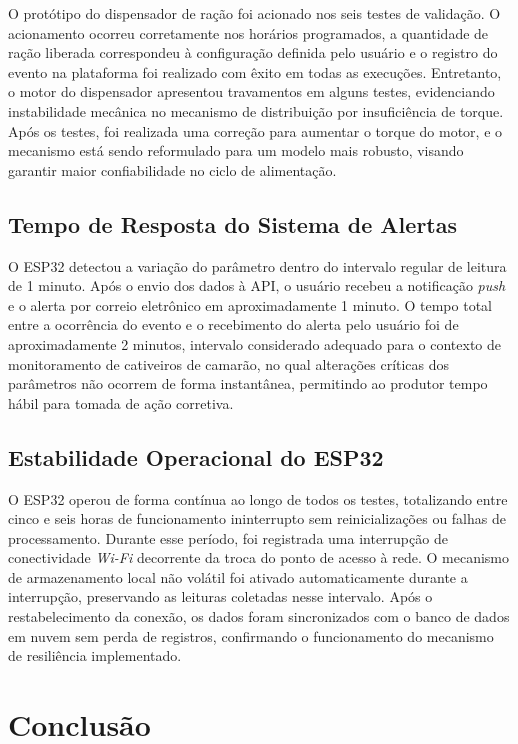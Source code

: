 \documentclass[11pt,a4paper]{article}
\begin{document}
O protótipo do dispensador de ração foi acionado nos seis testes de validação. O acionamento ocorreu corretamente nos horários programados, a quantidade de ração liberada correspondeu à configuração definida pelo usuário e o registro do evento na plataforma foi realizado com êxito em todas as execuções. Entretanto, o motor do dispensador apresentou travamentos em alguns testes, evidenciando instabilidade mecânica no mecanismo de distribuição por insuficiência de torque. Após os testes, foi realizada uma correção para aumentar o torque do motor, e o mecanismo está sendo reformulado para um modelo mais robusto, visando garantir maior confiabilidade no ciclo de alimentação.

\subsection{Tempo de Resposta do Sistema de Alertas}
O ESP32 detectou a variação do parâmetro dentro do intervalo regular de leitura de 1 minuto. Após o envio dos dados à API, o usuário recebeu a notificação \textit{push} e o alerta por correio eletrônico em aproximadamente 1 minuto. O tempo total entre a ocorrência do evento e o recebimento do alerta pelo usuário foi de aproximadamente 2 minutos, intervalo considerado adequado para o contexto de monitoramento de cativeiros de camarão, no qual alterações críticas dos parâmetros não ocorrem de forma instantânea, permitindo ao produtor tempo hábil para tomada de ação corretiva.

\subsection{Estabilidade Operacional do ESP32}
O ESP32 operou de forma contínua ao longo de todos os testes, totalizando entre cinco e seis horas de funcionamento ininterrupto sem reinicializações ou falhas de processamento. Durante esse período, foi registrada uma interrupção de conectividade \textit{Wi-Fi} decorrente da troca do ponto de acesso à rede. O mecanismo de armazenamento local não volátil foi ativado automaticamente durante a interrupção, preservando as leituras coletadas nesse intervalo. Após o restabelecimento da conexão, os dados foram sincronizados com o banco de dados em nuvem sem perda de registros, confirmando o funcionamento do mecanismo de resiliência implementado.

\section{Conclusão}
\end{document}
